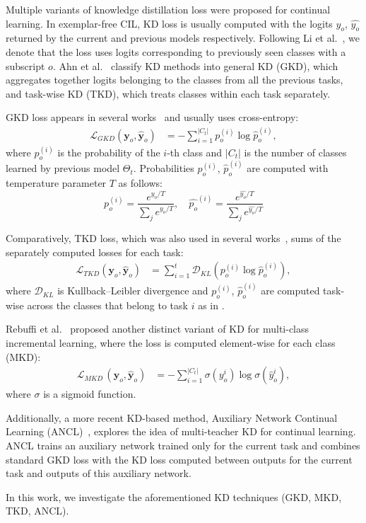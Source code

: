 \documentclass[10pt,twocolumn,letterpaper]{article}
\newcommand\rev[1]{{#1}}
\newcommand\gkd{GKD}
\newcommand\mkd{MKD}
\newcommand\tkd{TKD}
\begin{document}
\rev{Multiple variants of knowledge distillation loss were proposed for continual learning. In exemplar-free CIL, KD loss is usually computed with the logits $y_{o}$, $\hat{y_{o}}$ returned by the current and previous models respectively. Following Li et al.~\cite{li2017learning}, we denote that the loss uses logits corresponding to previously seen classes with a subscript $o$. Ahn et al.~\cite{ahn2021ss} classify KD methods into general KD (GKD), which aggregates together logits belonging to the classes from all the previous tasks, and task-wise KD (TKD), which treats classes within each task separately. 

GKD loss appears in several works~\cite{lee2019overcoming,wu2019large,zhao2020maintaining} and usually uses cross-entropy:
\begin{align}
\label{eq:gkd_loss}
    \mathcal{L}_{GKD}(\mathbf{y}_o,\mathbf{\hat{y}}_o) &= - \sum_{i=1}^{|C_{t}|} p_o^{(i)} \log \hat{p}_o^{(i)},
\end{align}
where $p_o^{(i)}$ is the probability of the $i$-th class and $|C_{t}|$ is the number of classes learned by previous model $\Theta_{t}$. Probabilities $p_o^{(i)}$, $\hat{p}_o^{(i)}$ are computed with temperature parameter $T$ as follows:
\begin{equation}
\label{eq:temp_norm}
p_o^{(i)} = \dfrac{e^{y_o / T}}{\sum_j e^{y_o / T}}, \quad\hat{p_o}^{(i)} = \dfrac{e^{\hat{y_o} / T}}{\sum_j e^{\hat{y_o} / T}}
\end{equation}

Comparatively, TKD loss, which was also used in several works~\cite{li2017learning,castro2018end,ahn2021ss}, sums of the separately computed losses for each task:
\begin{align}
\label{eq:tkd_loss}
    \mathcal{L}_{TKD}(\mathbf{y}_o,\mathbf{\hat{y}}_o) &= \sum_{i=1}^{t} \mathcal{D}_{KL}(p_o^{(i)} \log \hat{p}_o^{(i)}),
\end{align}
where $\mathcal{D}_{KL}$ is Kullback–Leibler divergence and $p_o^{(i)}$, $\hat{p}_o^{(i)}$ are computed task-wise across the classes that belong to task $i$ as in \Cref{eq:temp_norm}.

Rebuffi et al.~\cite{rebuffi2017icarl} proposed another distinct variant of KD for multi-class incremental learning, where the loss is computed element-wise for each class (MKD):
\begin{align}
\label{eq:icarl_loss}
    \mathcal{L}_{\mkd\ }(\mathbf{y}_o,\mathbf{\hat{y}}_o) &= - \sum_{i=1}^{|C_{t}|} \sigma(y_o^{i}) \log \sigma(\hat{y}_o^{i}),
\end{align}
where $\sigma$ is a sigmoid function.

Additionally, a more recent KD-based method, Auxiliary Network Continual Learning (ANCL)~\cite{kim2023achieving}, explores the idea of multi-teacher KD for continual learning. ANCL trains an auxiliary network trained only for the current task and combines standard GKD loss with the KD loss computed between outputs for the current task and outputs of this auxiliary network.

In this work, we investigate the aforementioned KD techniques (\gkd, \mkd, \tkd, ANCL).
}
\end{document}
